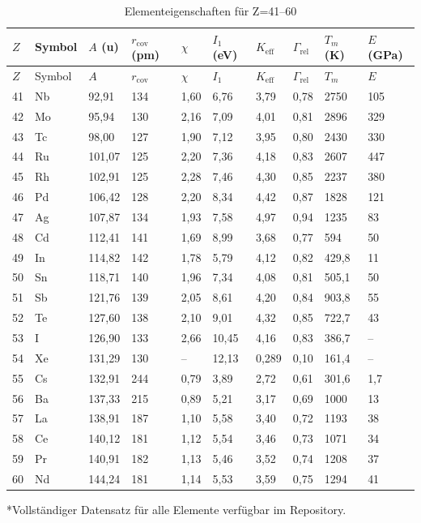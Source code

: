 \documentclass[12pt,a4paper]{article}
\newcommand{\Keff}{K_{\mathrm{eff}}}
\begin{document}
	\begin{longtable}{p{0.6cm}p{1.2cm}p{1.2cm}p{1.2cm}p{1.2cm}p{1.2cm}p{1.5cm}p{1.2cm}p{1.2cm}p{1.2cm}}
		\caption{Elementeigenschaften für Z=41–60} \label{tab:elem-data-41to60} \\
		\toprule
		\(Z\) & Symbol & \(A\) (u) & \(r_{\text{cov}}\) (pm) & \(\chi\) & \(I_1\) (eV) & \(\Keff\) & \(\Gamma_{\text{rel}}\) & \(T_m\) (K) & \(E\) (GPa) \\
		\midrule
		\endfirsthead
		\toprule
		\(Z\) & Symbol & \(A\) & \(r_{\text{cov}}\) & \(\chi\) & \(I_1\) & \(\Keff\) & \(\Gamma_{\text{rel}}\) & \(T_m\) & \(E\) \\
		\midrule
		\endhead
		41 & Nb & 92,91 & 134 & 1,60 & 6,76 & 3,79 & 0,78 & 2750 & 105 \\
		42 & Mo & 95,94 & 130 & 2,16 & 7,09 & 4,01 & 0,81 & 2896 & 329 \\
		43 & Tc & 98,00 & 127 & 1,90 & 7,12 & 3,95 & 0,80 & 2430 & 330 \\
		44 & Ru & 101,07 & 125 & 2,20 & 7,36 & 4,18 & 0,83 & 2607 & 447 \\
		45 & Rh & 102,91 & 125 & 2,28 & 7,46 & 4,30 & 0,85 & 2237 & 380 \\
		46 & Pd & 106,42 & 128 & 2,20 & 8,34 & 4,42 & 0,87 & 1828 & 121 \\
		47 & Ag & 107,87 & 134 & 1,93 & 7,58 & 4,97 & 0,94 & 1235 & 83 \\
		48 & Cd & 112,41 & 141 & 1,69 & 8,99 & 3,68 & 0,77 & 594 & 50 \\
		49 & In & 114,82 & 142 & 1,78 & 5,79 & 4,12 & 0,82 & 429,8 & 11 \\
		50 & Sn & 118,71 & 140 & 1,96 & 7,34 & 4,08 & 0,81 & 505,1 & 50 \\
		51 & Sb & 121,76 & 139 & 2,05 & 8,61 & 4,20 & 0,84 & 903,8 & 55 \\
		52 & Te & 127,60 & 138 & 2,10 & 9,01 & 4,32 & 0,85 & 722,7 & 43 \\
		53 & I  & 126,90 & 133 & 2,66 & 10,45 & 4,16 & 0,83 & 386,7 & – \\
		54 & Xe & 131,29 & 130 & –    & 12,13 & 0,289 & 0,10 & 161,4 & – \\
		55 & Cs & 132,91 & 244 & 0,79 & 3,89 & 2,72 & 0,61 & 301,6 & 1,7 \\
		56 & Ba & 137,33 & 215 & 0,89 & 5,21 & 3,17 & 0,69 & 1000 & 13 \\
		57 & La & 138,91 & 187 & 1,10 & 5,58 & 3,40 & 0,72 & 1193 & 38 \\
		58 & Ce & 140,12 & 181 & 1,12 & 5,54 & 3,46 & 0,73 & 1071 & 34 \\
		59 & Pr & 140,91 & 182 & 1,13 & 5,46 & 3,52 & 0,74 & 1208 & 37 \\
		60 & Nd & 144,24 & 181 & 1,14 & 5,53 & 3,59 & 0,75 & 1294 & 41 \\
		\bottomrule
	\end{longtable}
	*Vollständiger Datensatz für alle Elemente verfügbar im Repository.
	
\end{document}
